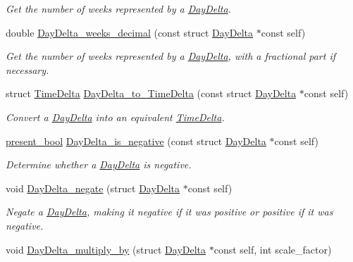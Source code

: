 \begin{DoxyCompactItemize}
\begin{DoxyCompactList}\small\item\em \-Get the number of weeks represented by a \hyperlink{structDayDelta}{\-Day\-Delta}. \end{DoxyCompactList}\item 
double \hyperlink{day-delta_8h_af6698416f241e2d9a6f54459fd0282ef}{\-Day\-Delta\-\_\-weeks\-\_\-decimal} (const struct \hyperlink{structDayDelta}{\-Day\-Delta} $\ast$const self)
\begin{DoxyCompactList}\small\item\em \-Get the number of weeks represented by a \hyperlink{structDayDelta}{\-Day\-Delta}, with a fractional part if necessary. \end{DoxyCompactList}\item 
struct \hyperlink{structTimeDelta}{\-Time\-Delta} \hyperlink{day-delta_8h_afaef350c558f8db4d84585c9bf64d871}{\-Day\-Delta\-\_\-to\-\_\-\-Time\-Delta} (const struct \hyperlink{structDayDelta}{\-Day\-Delta} $\ast$const self)
\begin{DoxyCompactList}\small\item\em \-Convert a \hyperlink{structDayDelta}{\-Day\-Delta} into an equivalent \hyperlink{structTimeDelta}{\-Time\-Delta}. \end{DoxyCompactList}\item 
\hyperlink{types_8h_a1c24e2cdd988b886e889080ded176ae0}{present\-\_\-bool} \hyperlink{day-delta_8h_ab4347a4d40f2e9577ce86f3fb5fb004d}{\-Day\-Delta\-\_\-is\-\_\-negative} (const struct \hyperlink{structDayDelta}{\-Day\-Delta} $\ast$const self)
\begin{DoxyCompactList}\small\item\em \-Determine whether a \hyperlink{structDayDelta}{\-Day\-Delta} is negative. \end{DoxyCompactList}\item 
void \hyperlink{day-delta_8h_a9deb74bc8d748a21449a16e658f16432}{\-Day\-Delta\-\_\-negate} (struct \hyperlink{structDayDelta}{\-Day\-Delta} $\ast$const self)
\begin{DoxyCompactList}\small\item\em \-Negate a \hyperlink{structDayDelta}{\-Day\-Delta}, making it negative if it was positive or positive if it was negative. \end{DoxyCompactList}\item 
void \hyperlink{day-delta_8h_af8c4a730c36c38da48ba2d6df982c167}{\-Day\-Delta\-\_\-multiply\-\_\-by} (struct \hyperlink{structDayDelta}{\-Day\-Delta} $\ast$const self, int scale\-\_\-factor)

\end{DoxyCompactItemize}
